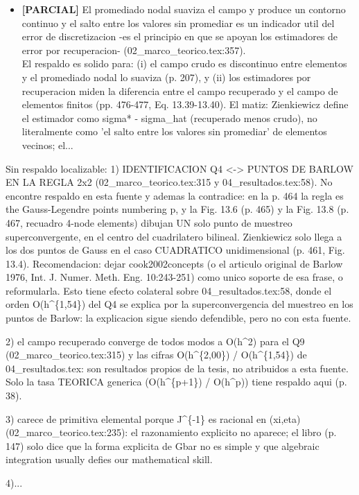 \documentclass[11pt,a4paper]{article}
\newcommand{\campo}[1]{\textcolor{gris}{\footnotesize #1}}
\begin{document}
\begin{itemize}
\item \textbf{[PARCIAL]} El promediado nodal \textquotedbl{}suaviza el campo y produce un contorno continuo\textquotedbl{} y \textquotedbl{}el salto entre los valores sin promediar es un indicador util del error de discretizacion -es el principio en que se apoyan los estimadores de error por recuperacion-\textquotedbl{} (02\_marco\_teorico.tex:357).
\\ \campo{El respaldo es solido para: (i) el campo crudo es discontinuo entre elementos y el promediado nodal lo suaviza (p. 207), y (ii) los estimadores por recuperacion miden la diferencia entre el campo recuperado y el campo de elementos finitos (pp. 476-477, Eq. 13.39-13.40). El matiz: Zienkiewicz define el estimador como \textbar{}\textbar{}sigma* - sigma\_hat\textbar{}\textbar{} (recuperado menos crudo), no literalmente como 'el salto entre los valores sin promediar' de elementos vecinos; el...}
\end{itemize}
{\small\campo{Sin respaldo localizable:} 1) IDENTIFICACION Q4 \textless{}-\textgreater{} PUNTOS DE BARLOW EN LA REGLA 2x2 (02\_marco\_teorico.tex:315 y 04\_resultados.tex:58). No encontre respaldo en esta fuente y ademas la contradice: en la p. 464 la regla es \textquotedbl{}the Gauss-Legendre points numbering p\textquotedbl{}, y la Fig. 13.6 (p. 465) y la Fig. 13.8 (p. 467, recuadro \textquotedbl{}4-node elements\textquotedbl{}) dibujan UN solo punto de muestreo superconvergente, en el centro del cuadrilatero bilineal. Zienkiewicz solo llega a los \textquotedbl{}dos puntos de Gauss\textquotedbl{} en el caso CUADRATICO unidimensional (p. 461, Fig. 13.4). Recomendacion: dejar cook2002concepts (o el articulo original de Barlow 1976, Int. J. Numer. Meth. Eng. 10:243-251) como unico soporte de esa frase, o reformularla. Esto tiene efecto colateral sobre 04\_resultados.tex:58, donde el orden O(h\textasciicircum{}\{1,54\}) del Q4 se explica \textquotedbl{}por la superconvergencia del muestreo en los puntos de Barlow\textquotedbl{}: la explicacion sigue siendo defendible, pero no con esta fuente.

2) \textquotedbl{}el campo recuperado converge de todos modos a O(h\textasciicircum{}2)\textquotedbl{} para el Q9 (02\_marco\_teorico.tex:315) y las cifras O(h\textasciicircum{}\{2,00\}) / O(h\textasciicircum{}\{1,54\}) de 04\_resultados.tex: son resultados propios de la tesis, no atribuidos a esta fuente. Solo la tasa TEORICA generica (O(h\textasciicircum{}\{p+1\}) / O(h\textasciicircum{}p)) tiene respaldo aqui (p. 38).

3) \textquotedbl{}carece de primitiva elemental\textquotedbl{} porque \textquotedbl{}J\textasciicircum{}\{-1\} es racional en (xi,eta)\textquotedbl{} (02\_marco\_teorico.tex:235): el razonamiento explicito no aparece; el libro (p. 147) solo dice que la forma explicita de Gbar no es simple y que \textquotedbl{}algebraic integration usually defies our mathematical skill\textquotedbl{}.

4)...\par}
\end{document}
